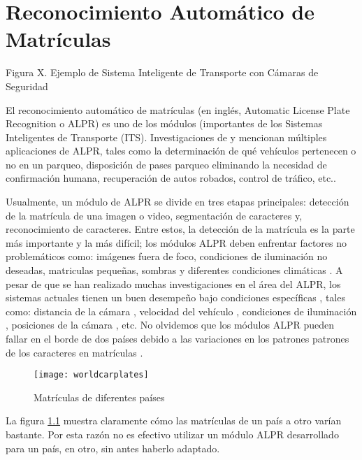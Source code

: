 \chapter{Reconocimiento Automático de Matrículas}
Figura X. Ejemplo de Sistema Inteligente de Transporte con Cámaras de Seguridad \cite{TechFAQ2016-oi}

El reconocimiento automático de matrículas (en inglés, Automatic License Plate Recognition o ALPR) es uno de los módulos (importantes de los Sistemas Inteligentes de Transporte (ITS). Investigaciones de \cite{Anagnostopoulos2008-uh} y \cite{TechTarget2016-gw} mencionan múltiples aplicaciones de ALPR, tales como la determinación de qué vehículos pertenecen o no en un parqueo, disposición de pases parqueo eliminando la necesidad de confirmación humana, recuperación de autos robados, control de tráfico, etc..

Usualmente, un módulo de ALPR se divide en tres etapas principales: detección de la matrícula de una imagen o video, segmentación de caracteres y, reconocimiento de caracteres. Entre estos, la detección de la matrícula es la parte más importante y la más difícil; los módulos ALPR deben enfrentar factores no problemáticos como: imágenes fuera de foco, condiciones de iluminación no deseadas, matriculas pequeñas, sombras y diferentes condiciones climáticas \cite{Mahini2006-us}.
A pesar de que se han realizado muchas investigaciones en el área del ALPR, los sistemas actuales tienen un buen desempeño bajo condiciones específicas \cite{Anagnostopoulos2006-is}, tales como: distancia de la cámara \cite{Martin2002-zu,Guo2008-qk}, velocidad del vehículo \cite{Garibotto2001-lu}, condiciones de iluminación \cite{Xiong2004-qv,Mahini2006-us}, posiciones de la cámara \cite{Chang2004-kg}, etc. No olvidemos que los módulos ALPR pueden fallar en el borde de dos países debido a las variaciones en los patrones patrones de los caracteres en matrículas \cite{Anagnostopoulos2006-is,Shapiro2006-rv,Mecocci2006-nt}.

  \begin{figure}[H]
        \centering
        \texttt{[image: worldcarplates]}
        \caption{ Matrículas de diferentes países \protect\cite{Kustermann2016-yd}}
        \label{fig:worldcarplates}
\end{figure}  

La figura \ref{fig:worldcarplates} muestra claramente cómo las matrículas de un país a otro varían bastante. Por esta razón no es efectivo utilizar un módulo ALPR desarrollado para un país, en otro, sin antes haberlo adaptado.

